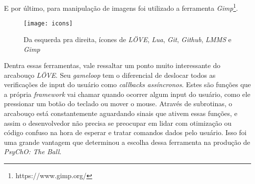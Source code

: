 E por último, para manipulação de imagens foi utilizado a ferramenta \textit{Gimp}\footnote{https://www.gimp.org/}.

\begin{figure}[h!]
\texttt{[image: icons]}
\centering
\caption{Da esquerda pra direita, ícones de \textit{LÖVE}, \textit{Lua}, \textit{Git}, \textit{Github}, \textit{LMMS} e \textit{Gimp}}
\end{figure}

Dentra essas ferramentas, vale ressaltar um ponto muito interessante do arcabouço \textit{LÖVE}. Seu \textit{gameloop} tem o diferencial de deslocar todos as verificações de input do usuário como \textit{callbacks assíncronos}. Estes são funções que a própria \textit{framework} vai chamar quando ocorrer algum input do usuário, como ele pressionar um botão do teclado ou mover o mouse. Através de subrotinas, o arcabouço está constantemente aguardando sinais que ativem essas funções, e assim o desenvolvedor não precisa se preocupar em lidar com otimização ou código confuso na hora de esperar e tratar comandos dados pelo usuário. Isso foi uma grande vantagem que determinou a escolha dessa ferramenta na produção de \textit{PsyChO: The Ball}.

